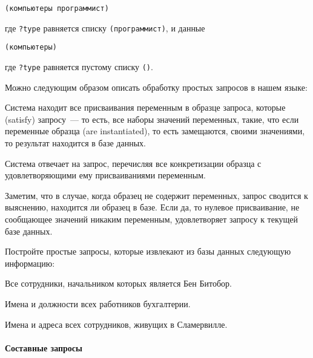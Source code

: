 \begin{Verbatim}[fontsize=\small]
(компьютеры программист)
\end{Verbatim}
где {\tt ?type} равняется списку {\tt (программист)},
и  данные

\begin{Verbatim}[fontsize=\small]
(компьютеры)
\end{Verbatim}
где {\tt ?type} равняется пустому списку
{\tt ()}.

Можно следующим образом описать обработку
простых запросов в нашем языке:

\begin{plainlist}
\item
Система находит все присваивания переменным в
образце запроса, которые 
 (satisfy) запросу~---
то есть, все наборы значений переменных, такие, что если переменные
образца  (are instantiated), то есть замещаются,
своими значениями, то результат находится в базе данных.

\item
Система отвечает на запрос, перечисляя все
конкретизации образца с удовлетворяющими ему присваиваниями
переменным.
\end{plainlist}
Заметим, что в случае, когда образец не содержит переменных, запрос
сводится к выяснению, находится ли образец в базе.  Если да, то
нулевое присваивание, не сообщающее значений никаким переменным,
удовлетворяет запросу к текущей базе данных.

\begin{exercise}{4.55}%
\label{EX4.55}%
Постройте простые запросы, которые извлекают из базы
данных следующую информацию:

\begin{plainenum}
\item
Все сотрудники, начальником которых является Бен
Битобор.
\item
Имена и должности всех работников
бухгалтерии.

\item
 Имена и адреса всех сотрудников, живущих в
Сламервилле.
\end{plainenum}
\end{exercise}

\paragraph{Составные запросы}


